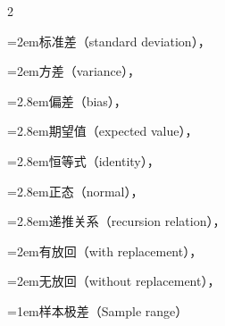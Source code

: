\begin{multicols}{2}
\par\noindent\hangindent=2em\hspace*{1em}\label{idx:935}标准差（standard deviation），\hyperref[def:5.2.3]{\pageref*{def:5.2.3}}\par
\par\noindent\hangindent=2em\hspace*{1em}\label{idx:936}方差（variance），\hyperref[def:5.2.3]{\pageref*{def:5.2.3}}\par
\par\noindent\hangindent=2.8em\hspace*{1.8em}\label{idx:937}偏差（bias），\hyperref[sec:5.8.2]{\pageref*{sec:5.8.2}}\par
\par\noindent\hangindent=2.8em\hspace*{1.8em}\label{idx:938}期望值（expected value），\hyperref[thm:5.2.6]{\pageref*{thm:5.2.6}}\par
\par\noindent\hangindent=2.8em\hspace*{1.8em}\label{idx:939}恒等式（identity），\hyperref[exercise:5.8]{\pageref*{exercise:5.8}}\par
\par\noindent\hangindent=2.8em\hspace*{1.8em}\label{idx:940}正态（normal），\hyperref[thm:5.3.1]{\pageref*{thm:5.3.1}}\par
\par\noindent\hangindent=2.8em\hspace*{1.8em}\label{idx:941}递推关系（recursion relation），\hyperref[exercise:5.15]{\pageref*{exercise:5.15}}\par
\par\noindent\hangindent=2em\hspace*{1em}\label{idx:942}有放回（with replacement），\hyperref[idxocc:942:202]{\pageref*{idxocc:942:202}}\par
\par\noindent\hangindent=2em\hspace*{1em}\label{idx:943}无放回（without replacement），\hyperref[idxocc:943:202]{\pageref*{idxocc:943:202}}\par
\par\addvspace{2pt}
\par\noindent\hangindent=1em\hspace*{0em}\label{idx:944}样本极差（Sample range）\par

\end{multicols}
